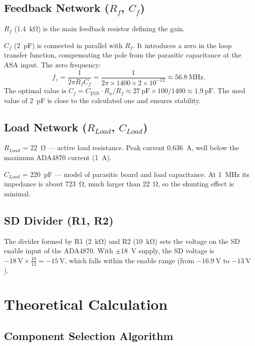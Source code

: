 \documentclass[a4paper, 12pt]{article}
\begin{document}
\subsection{Feedback Network \texorpdfstring{(\(R_f\), \(C_f\))}{Rf, Cf}}

\textbf{\(R_f\)} (1.4~kΩ) is the main feedback resistor defining the gain.

\textbf{\(C_f\)} (2~pF) is connected in parallel with \(R_f\). It introduces
a zero in the loop transfer function, compensating the pole from the
parasitic capacitance at the ASA input.
The zero frequency:
\[
    f_{z} = \frac{1}{2\pi R_f C_f}
    = \frac{1}{2\pi \times 1400 \times 2\times 10^{-12}}
    \approx 56.8\ \text{MHz}.
\]
The optimal value is \(C_f = C_{\text{INN}} \cdot R_a / R_f
\approx 27\ \text{pF} \times 100 / 1400 \approx 1.9\ \text{pF}\).
The used value of 2~pF is close to the calculated one and ensures stability.

\subsection{Load Network \texorpdfstring{(\(R_{Load}\), \(C_{Load}\))}{Rload, Cload}}

\textbf{\(R_{Load}\)} = 22~Ω — active load resistance.
Peak current 0.636~A, well below the maximum ADA4870 current (1~A).

\textbf{\(C_{Load}\)} = 220~pF — model of parasitic board and load capacitance.
At 1~MHz its impedance is about 723~Ω, much larger than 22~Ω, so the
shunting effect is minimal.

\subsection{SD Divider (R1, R2)}

The divider formed by R1 (2~kΩ) and R2 (10~kΩ) sets the voltage on the
SD enable input of the ADA4870.
With $\pm 18$~V supply, the SD voltage is
\(-18\ \text{V} \times \frac{10}{12} = -15\ \text{V}\),
which falls within the enable range (from \(-16.9\ \text{V}\)
to \(-13\ \text{V}\)).

\section{Theoretical Calculation}

\subsection{Component Selection Algorithm}
\label{sec:algorithm}
\end{document}
